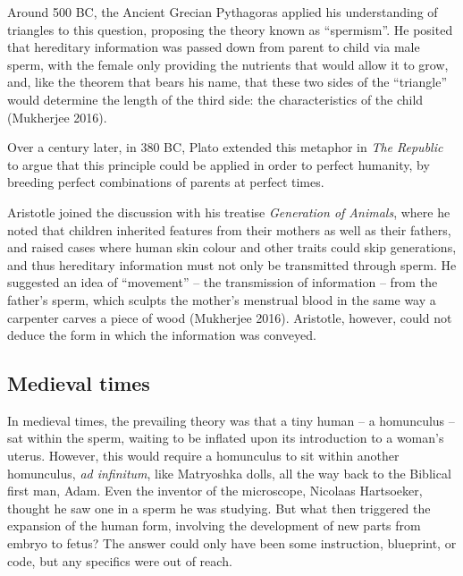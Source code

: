 \documentclass[
]{book}
\begin{document}
Around 500 BC, the Ancient Grecian Pythagoras applied his understanding of triangles to this question, proposing the theory known as ``spermism''. He posited that hereditary information was passed down from parent to child via male sperm, with the female only providing the nutrients that would allow it to grow, and, like the theorem that bears his name, that these two sides of the ``triangle'' would determine the length of the third side: the characteristics of the child (Mukherjee 2016).

Over a century later, in 380 BC, Plato extended this metaphor in \emph{The Republic} to argue that this principle could be applied in order to perfect humanity, by breeding perfect combinations of parents at perfect times.

Aristotle joined the discussion with his treatise \emph{Generation of Animals}, where he noted that children inherited features from their mothers as well as their fathers, and raised cases where human skin colour and other traits could skip generations, and thus hereditary information must not only be transmitted through sperm. He suggested an idea of ``movement'' -- the transmission of information -- from the father's sperm, which sculpts the mother's menstrual blood in the same way a carpenter carves a piece of wood (Mukherjee 2016). Aristotle, however, could not deduce the form in which the information was conveyed.

\hypertarget{medieval-times}{%
\subsection{Medieval times}\label{medieval-times}}

In medieval times, the prevailing theory was that a tiny human -- a homunculus -- sat within the sperm, waiting to be inflated upon its introduction to a woman's uterus. However, this would require a homunculus to sit within another homunculus, \emph{ad infinitum}, like Matryoshka dolls, all the way back to the Biblical first man, Adam. Even the inventor of the microscope, Nicolaas Hartsoeker, thought he saw one in a sperm he was studying. But what then triggered the expansion of the human form, involving the development of new parts from embryo to fetus? The answer could only have been some instruction, blueprint, or code, but any specifics were out of reach.
\end{document}

